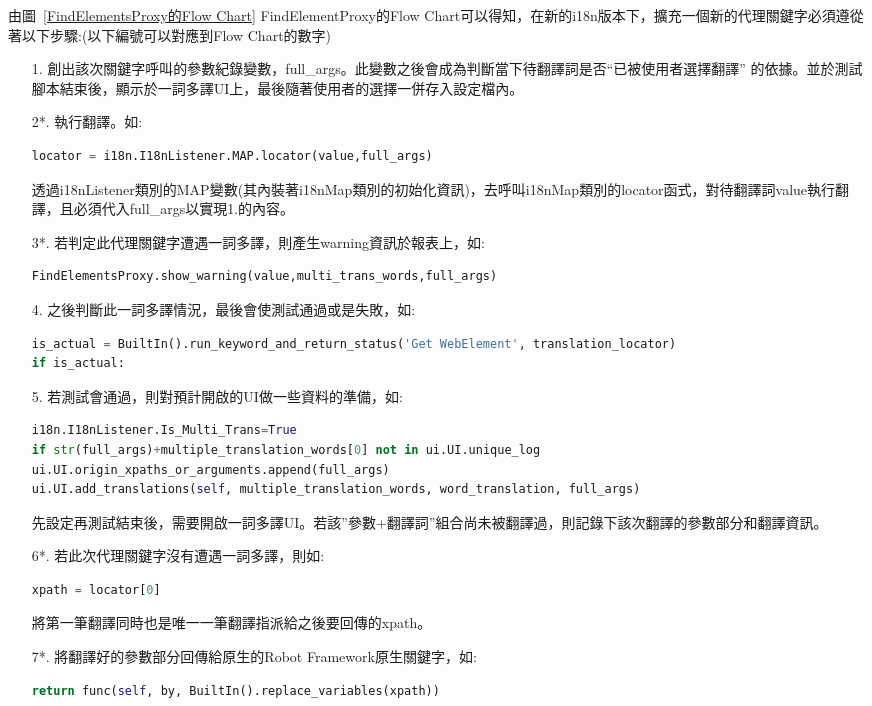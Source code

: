 由圖~\ref{FindElementsProxy的Flow Chart} FindElementProxy的Flow Chart可以得知，在新的i18n版本下，擴充一個新的代理關鍵字必須遵從著以下步驟:(以下編號可以對應到Flow Chart的數字)
\begin{itemize}
\item[1.]創出該次關鍵字呼叫的參數紀錄變數，full\_args。此變數之後會成為判斷當下待翻譯詞是否“已被使用者選擇翻譯” 的依據。並於測試腳本結束後，顯示於一詞多譯UI上，最後隨著使用者的選擇一併存入設定檔內。

\item[2*.]執行翻譯。如:
\begin{lstlisting}[language={python}]
locator = i18n.I18nListener.MAP.locator(value,full_args)
\end{lstlisting}
透過i18nListener類別的MAP變數(其內裝著i18nMap類別的初始化資訊)，去呼叫i18nMap類別的locator函式，對待翻譯詞value執行翻譯，且必須代入full\_args以實現1.的內容。

\item[3*.]若判定此代理關鍵字遭遇一詞多譯，則產生warning資訊於報表上，如:
\begin{lstlisting}[language={python}]
FindElementsProxy.show_warning(value,multi_trans_words,full_args)
\end{lstlisting}

\item[4.]之後判斷此一詞多譯情況，最後會使測試通過或是失敗，如:
\begin{lstlisting}[language={python}]
is_actual = BuiltIn().run_keyword_and_return_status('Get WebElement', translation_locator)
if is_actual:
\end{lstlisting}

\item[5.]若測試會通過，則對預計開啟的UI做一些資料的準備，如:
\begin{lstlisting}[language={python}]
i18n.I18nListener.Is_Multi_Trans=True
if str(full_args)+multiple_translation_words[0] not in ui.UI.unique_log
ui.UI.origin_xpaths_or_arguments.append(full_args)
ui.UI.add_translations(self, multiple_translation_words, word_translation, full_args)
\end{lstlisting}
先設定再測試結束後，需要開啟一詞多譯UI。若該”參數+翻譯詞”組合尚未被翻譯過，則記錄下該次翻譯的參數部分和翻譯資訊。

\item[6*.]若此次代理關鍵字沒有遭遇一詞多譯，則如:
\begin{lstlisting}[language={python}]
xpath = locator[0]
\end{lstlisting}
將第一筆翻譯同時也是唯一一筆翻譯指派給之後要回傳的xpath。

\item[7*.]將翻譯好的參數部分回傳給原生的Robot Framework原生關鍵字，如:
\begin{lstlisting}[language={python}]
return func(self, by, BuiltIn().replace_variables(xpath))
\end{lstlisting}
\end{itemize}

